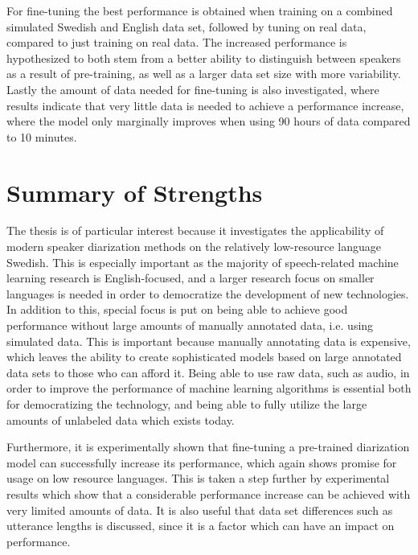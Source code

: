 \documentclass{article}
\begin{document}
For fine-tuning the best performance is obtained when training on a combined simulated Swedish and English data set, followed by tuning on real data, compared to just training on real data. The increased performance is hypothesized to both stem from a better ability to distinguish between speakers as a result of pre-training, as well as a larger data set size with more variability. Lastly the amount of data needed for fine-tuning is also investigated, where results indicate that very little data is needed to achieve a performance increase, where the model only marginally improves when using 90 hours of data compared to 10 minutes.


\section{Summary of Strengths}


The thesis is of particular interest because it investigates the applicability of modern speaker diarization methods on the relatively low-resource language Swedish. This is especially important as the majority of speech-related machine learning research is English-focused, and a larger research focus on smaller languages is needed in order to democratize the development of new technologies. In addition to this, special focus is put on being able to achieve good performance without large amounts of manually annotated data, i.e. using simulated data. This is important because manually annotating data is expensive, which leaves the ability to create sophisticated models based on large annotated data sets to those who can afford it. Being able to use raw data, such as audio, in order to improve the performance of machine learning algorithms is essential both for democratizing the technology, and being able to fully utilize the large amounts of unlabeled data which exists today.

Furthermore, it is experimentally shown that fine-tuning a pre-trained diarization model can successfully increase its performance, which again shows promise for usage on low resource languages. This is taken a step further by experimental results which show that a considerable performance increase can be achieved with very limited amounts of data. It is also useful that data set differences such as utterance lengths is discussed, since it is a factor which can have an impact on performance.
\end{document}
